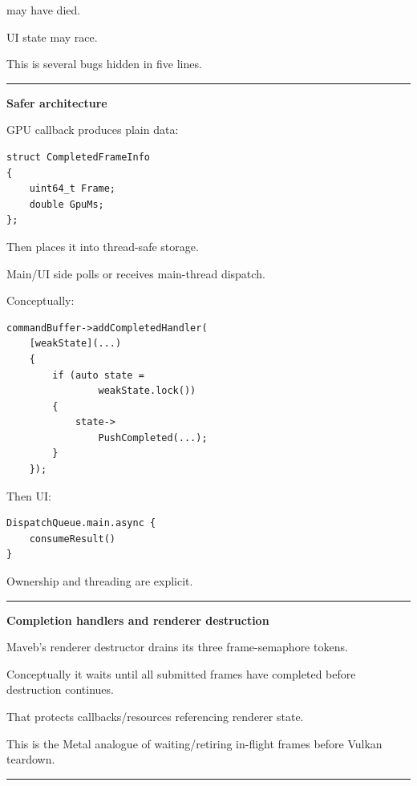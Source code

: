  may have died.

UI state may race.

This is several bugs hidden in five lines.

\begin{center}\rule{0.5\linewidth}{0.5pt}\end{center}

\textbf{Safer architecture}

GPU callback produces plain data:

\begin{verbatim}
struct CompletedFrameInfo
{
    uint64_t Frame;
    double GpuMs;
};
\end{verbatim}

Then places it into thread-safe storage.

Main/UI side polls or receives main-thread dispatch.

Conceptually:

\begin{verbatim}
commandBuffer->addCompletedHandler(
    [weakState](...)
    {
        if (auto state =
                weakState.lock())
        {
            state->
                PushCompleted(...);
        }
    });
\end{verbatim}

Then UI:

\begin{verbatim}
DispatchQueue.main.async {
    consumeResult()
}
\end{verbatim}

Ownership and threading are explicit.

\begin{center}\rule{0.5\linewidth}{0.5pt}\end{center}

\textbf{Completion handlers and renderer destruction}

Maveb's renderer destructor drains its three frame-semaphore tokens.

Conceptually it waits until all submitted frames have completed before destruction continues.

That protects callbacks/resources referencing renderer state.

This is the Metal analogue of waiting/retiring in-flight frames before Vulkan teardown.

\begin{center}\rule{0.5\linewidth}{0.5pt}\end{center}


